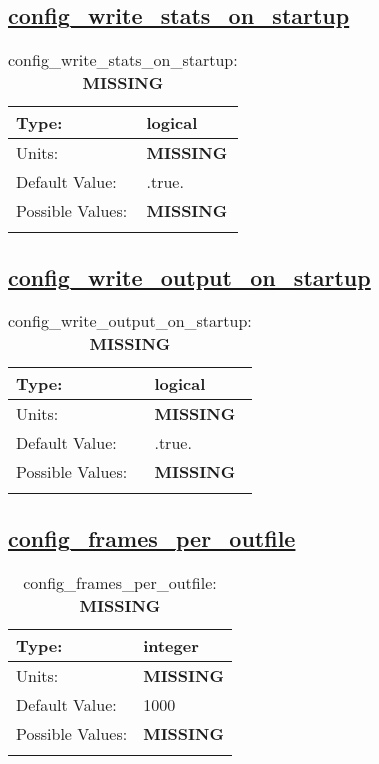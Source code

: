 \subsection[config\_write\_stats\_on\_startup]{\hyperref[sec:nm_tab_io]{config\_write\_stats\_on\_startup}}
\label{subsec:nm_sec_config_write_stats_on_startup}
\begin{center}
\begin{longtable}{| p{2.0in} | p{4.0in} |}
    \hline
    Type: & logical \\
    \hline
    Units: & {\bf \color{red} MISSING} \\
    \hline
    Default Value: & .true. \\
    \hline
    Possible Values: & {\bf \color{red} MISSING} \\
    \hline
    \caption{config\_write\_stats\_on\_startup: {\bf \color{red} MISSING}}
\end{longtable}
\end{center}
\subsection[config\_write\_output\_on\_startup]{\hyperref[sec:nm_tab_io]{config\_write\_output\_on\_startup}}
\label{subsec:nm_sec_config_write_output_on_startup}
\begin{center}
\begin{longtable}{| p{2.0in} | p{4.0in} |}
    \hline
    Type: & logical \\
    \hline
    Units: & {\bf \color{red} MISSING} \\
    \hline
    Default Value: & .true. \\
    \hline
    Possible Values: & {\bf \color{red} MISSING} \\
    \hline
    \caption{config\_write\_output\_on\_startup: {\bf \color{red} MISSING}}
\end{longtable}
\end{center}
\subsection[config\_frames\_per\_outfile]{\hyperref[sec:nm_tab_io]{config\_frames\_per\_outfile}}
\label{subsec:nm_sec_config_frames_per_outfile}
\begin{center}
\begin{longtable}{| p{2.0in} | p{4.0in} |}
    \hline
    Type: & integer \\
    \hline
    Units: & {\bf \color{red} MISSING} \\
    \hline
    Default Value: & 1000 \\
    \hline
    Possible Values: & {\bf \color{red} MISSING} \\
    \hline
    \caption{config\_frames\_per\_outfile: {\bf \color{red} MISSING}}
\end{longtable}
\end{center}
